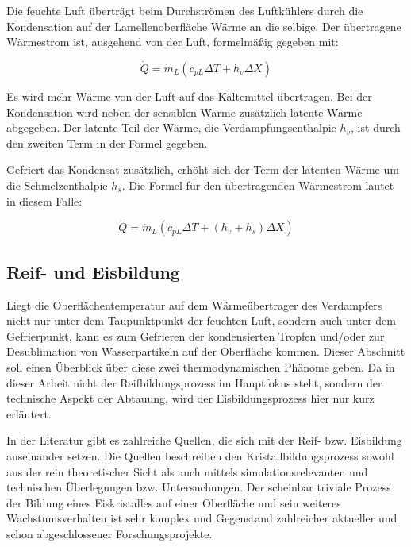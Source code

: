 Die feuchte Luft überträgt beim Durchströmen des Luftkühlers durch die Kondensation auf der Lamellenoberfläche Wärme an die selbige. Der übertragene Wärmestrom ist, ausgehend von der Luft, formelmäßig gegeben mit: 

\begin{equation}
\dot{Q}= \dot{m}_L (c_{pL}\Delta T + h_v \Delta X)
\label{eq:Wärmestrom feuchte luft}
\end{equation}

 Es wird mehr Wärme von der Luft auf das Kältemittel übertragen. Bei der Kondensation wird neben der sensiblen Wärme zusätzlich latente Wärme abgegeben. Der latente Teil der Wärme, die Verdampfungsenthalpie $h_v$, ist durch den zweiten Term in der Formel gegeben. 

Gefriert das Kondensat zusätzlich, erhöht sich der Term der latenten Wärme um die Schmelzenthalpie $h_s$. Die Formel für den übertragenden Wärmestrom lautet in diesem Falle: 

\begin{equation}
\dot{Q}= \dot{m}_L (c_{pL}\Delta T + (h_v+ h_s) \Delta X)
\label{eq:Wärmestrom Reif}
\end{equation}

\citep{Grote2014}
\citep{Baehr2013}

\subsection{Reif- und Eisbildung}
\label{subsec:Reifbildung}

Liegt die Oberflächentemperatur auf dem Wärmeübertrager des Verdampfers nicht nur unter dem Taupunktpunkt der feuchten Luft, sondern auch unter dem Gefrierpunkt, kann es zum Gefrieren der kondensierten Tropfen und/oder zur Desublimation von Wasserpartikeln auf der Oberfläche kommen. Dieser Abschnitt soll einen Überblick über diese zwei thermodynamischen Phänome geben. Da in dieser Arbeit nicht der Reifbildungsprozess im Hauptfokus steht, sondern  der technische Aspekt der Abtauung, wird der Eisbildungsprozess hier nur kurz erläutert.

In der Literatur gibt es zahlreiche Quellen, die sich mit der Reif- bzw. Eisbildung auseinander setzen. Die Quellen beschreiben den Kristallbildungsprozess sowohl aus der rein theoretischer Sicht als auch mittels simulationsrelevanten und technischen Überlegungen bzw. Untersuchungen. Der scheinbar triviale Prozess der Bildung eines Eiskristalles auf einer Oberfläche und sein weiteres Wachstumsverhalten ist sehr komplex und Gegenstand zahlreicher aktueller und schon abgeschlossener Forschungsprojekte.

